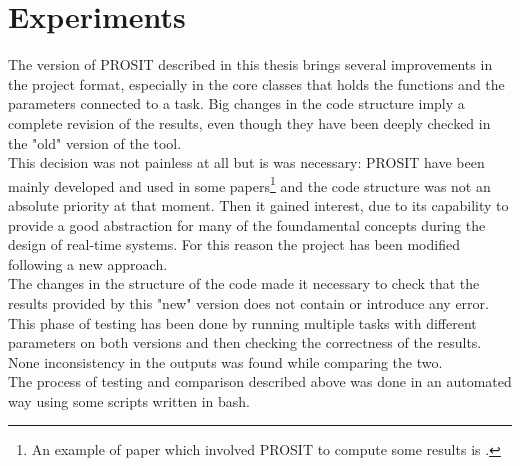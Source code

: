 \chapter{Experiments}\label{chp:experiments}


The version of PROSIT described in this thesis brings several improvements in the project format, especially in the core classes that holds the functions and the parameters connected to a task. Big changes in the code structure imply a complete revision of the results, even though they have been deeply checked in the "old" version of the tool.\\
This decision was not painless at all but is was necessary: PROSIT have been mainly developed and used in some papers\footnote{An example of paper which involved PROSIT to compute some results is \cite{probGuarantees}.} and the code structure was not an absolute priority at that moment. Then it gained interest, due to its capability to provide a good abstraction for many of the foundamental concepts during the design of real-time systems. For this reason the project has been modified following a new approach.\\
The changes in the structure of the code made it necessary to check that the results provided by this "new" version does not contain or introduce any error. This phase of testing has been done by running multiple tasks with different parameters on both versions and then checking the correctness of the results. None inconsistency in the outputs was found while comparing the two.\\
The process of testing and comparison described above was done in an automated way using some scripts written in bash.

